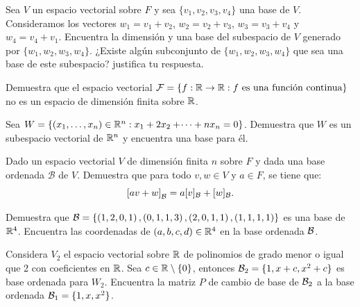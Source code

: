 \documentclass[12pt,a4paper]{book}
\newcommand{\llaves}[1]{\{#1\}}
\newcommand{\parentesis}[1]{\left(#1\right)}
\newcommand{\corchetes}[1]{\left[#1\right]}
\begin{document}
    \begin{ejercicio}
        Sea $V$ un espacio vectorial sobre $F$ y sea $\llaves{v_{1}, v_{2}, v_{3}, v_{4}}$ una base de $V$. Consideramos los vectores $w_{1} = v_{1} + v_{2}$, $w_{2} = v_{2} + v_{3}$, $w_{3} = v_{3} + v_{4}$ y $w_{4} = v_{4} + v_{1}$. Encuentra la dimensión y una base del subespacio de $V$ generado por $\llaves{w_{1}, w_{2}, w_{3}, w_{4}}$. ¿Existe algún subconjunto de $\llaves{w_{1}, w_{2}, w_{3}, w_{4}}$ que sea una base de este subespacio? justifica tu respuesta.
    \end{ejercicio}

    \begin{ejercicio}
        Demuestra que el espacio vectorial $\mathcal{F} = \llaves{f: \R \to \R : f \text{ es una función continua}}$ no es un espacio de dimensión finita sobre $\mathbb{R}$.
    \end{ejercicio}

    \begin{ejercicio}
        Sea $W = \llaves{(x_{1}, \dots, x_{n}) \in \R^{n} : x_{1} + 2x_{2} + \dotsi + nx_{n} = 0}$. Demuestra que $W$ es un subespacio vectorial de $\mathbb{R}^{n}$ y encuentra una base para él.
    \end{ejercicio}

    \begin{ejercicio}
        Dado un espacio vectorial $V$ de dimensión finita $n$ sobre $F$ y dada una base ordenada $\mathcal{B}$ de $V$. Demuestra que para todo $v, w \in V$ y $a \in F$, se tiene que:
        \begin{equation*}
        \corchetes{av + w}_{\BB} = a[v]_{\BB} + [w]_{\BB}.
        \end{equation*}
    \end{ejercicio}

    \begin{ejercicio}
        Demuestra que $\BB = \llaves{\parentesis{1, 2, 0, 1}, \parentesis{0, 1, 1, 3}, \parentesis{2, 0, 1, 1},(1, 1, 1, 1)}$ es una base de $\mathbb{R}^{4}$. Encuentra las coordenadas de $(a, b, c, d) \in \mathbb{R}^{4}$ en la base ordenada $\mathcal{B}$.
    \end{ejercicio}

    \begin{ejercicio}
        Considera $V_{2}$ el espacio vectorial sobre $\mathbb{R}$ de polinomios de grado menor o igual que 2 con coeficientes en $\mathbb{R}$. Sea $c \in \R \setminus \llaves{0}$, entonces $\BB_{2} = \llaves{1, x + c, x^{2} + c}$ es base ordenada para $W_{2}$. Encuentra la matriz $P$ de cambio de base de $\mathcal{B}_{2}$ a la base ordenada $\BB_{1} = \llaves{1, x, x^{2}}$.
    \end{ejercicio}
\end{document}

